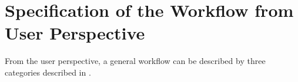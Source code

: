 \documentclass[a4paper]{article}
\begin{document}

\section{Specification of the Workflow from User Perspective}

From the user perspective, a general workflow can be described by three categories described in .
\end{document}
